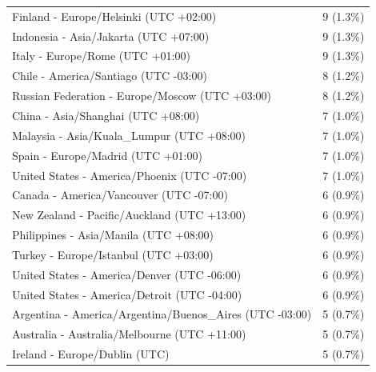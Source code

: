 \begin{appendix}
\begin{table}
{\begin{tabular}[t]{ll}
\hspace{1em}Finland - Europe/Helsinki (UTC +02:00) & 9 (1.3\%)\\
\addlinespace
\hspace{1em}Indonesia - Asia/Jakarta (UTC +07:00) & 9 (1.3\%)\\
\hspace{1em}Italy - Europe/Rome (UTC +01:00) & 9 (1.3\%)\\
\hspace{1em}Chile - America/Santiago (UTC -03:00) & 8 (1.2\%)\\
\hspace{1em}Russian Federation - Europe/Moscow (UTC +03:00) & 8 (1.2\%)\\
\hspace{1em}China - Asia/Shanghai (UTC +08:00) & 7 (1.0\%)\\
\addlinespace
\hspace{1em}Malaysia - Asia/Kuala\_Lumpur (UTC +08:00) & 7 (1.0\%)\\
\hspace{1em}Spain - Europe/Madrid (UTC +01:00) & 7 (1.0\%)\\
\hspace{1em}United States - America/Phoenix (UTC -07:00) & 7 (1.0\%)\\
\hspace{1em}Canada - America/Vancouver (UTC -07:00) & 6 (0.9\%)\\
\hspace{1em}New Zealand - Pacific/Auckland (UTC +13:00) & 6 (0.9\%)\\
\addlinespace
\hspace{1em}Philippines - Asia/Manila (UTC +08:00) & 6 (0.9\%)\\
\hspace{1em}Turkey - Europe/Istanbul (UTC +03:00) & 6 (0.9\%)\\
\hspace{1em}United States - America/Denver (UTC -06:00) & 6 (0.9\%)\\
\hspace{1em}United States - America/Detroit (UTC -04:00) & 6 (0.9\%)\\
\hspace{1em}Argentina - America/Argentina/Buenos\_Aires (UTC -03:00) & 5 (0.7\%)\\
\addlinespace
\hspace{1em}Australia - Australia/Melbourne (UTC +11:00) & 5 (0.7\%)\\
\hspace{1em}Ireland - Europe/Dublin (UTC) & 5 (0.7\%)\\

\end{tabular}}
\end{table}
\end{appendix}
